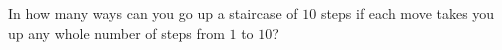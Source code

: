 In how many ways can you go up a staircase of $10$ steps if each move takes you up any whole number of steps from $1$ to $10$?
